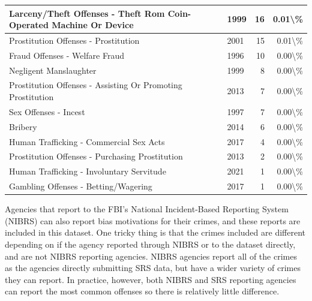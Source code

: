 \documentclass[
]{krantz}
\begin{document}
\begin{longtable}[t]{l|l|r|r}
\hline
Larceny/Theft Offenses - Theft Rom Coin-Operated Machine Or Device & 1999 & 16 & 0.01\textbackslash{}\%\\
\hline
Prostitution Offenses - Prostitution & 2001 & 15 & 0.01\textbackslash{}\%\\
\hline
Fraud Offenses - Welfare Fraud & 1996 & 10 & 0.00\textbackslash{}\%\\
\hline
Negligent Manslaughter & 1999 & 8 & 0.00\textbackslash{}\%\\
\hline
Prostitution Offenses - Assisting Or Promoting Prostitution & 2013 & 7 & 0.00\textbackslash{}\%\\
\hline
Sex Offenses - Incest & 1997 & 7 & 0.00\textbackslash{}\%\\
\hline
Bribery & 2014 & 6 & 0.00\textbackslash{}\%\\
\hline
Human Trafficking - Commercial Sex Acts & 2017 & 4 & 0.00\textbackslash{}\%\\
\hline
Prostitution Offenses - Purchasing Prostitution & 2013 & 2 & 0.00\textbackslash{}\%\\
\hline
Human Trafficking - Involuntary Servitude & 2021 & 1 & 0.00\textbackslash{}\%\\
\hline
Gambling Offenses - Betting/Wagering & 2017 & 1 & 0.00\textbackslash{}\%\\
\hline
\end{longtable}

Agencies that report to the FBI's National Incident-Based
Reporting System (NIBRS) can also report bias motivations
for their crimes, and these reports are included in this
dataset. One tricky thing is that the crimes included are
different depending on if the agency reported through NIBRS
or to the dataset directly, and are not NIBRS reporting
agencies. NIBRS agencies report all of the crimes as the
agencies directly submitting SRS data, but have a wider
variety of crimes they can report. In practice, however,
both NIBRS and SRS reporting agencies can report the most
common offenses so there is relatively little difference.
\end{document}
